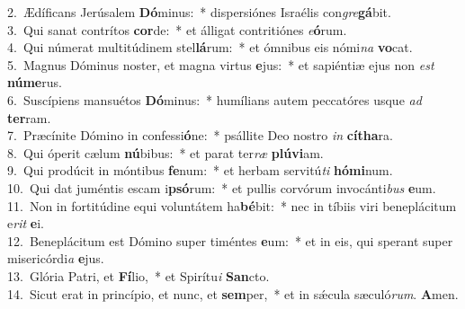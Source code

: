 {2.~}Ædíficans Jerúsalem \textbf{Dó}minus:~* dispersiónes Israélis con\textit{gre}\textbf{gá}bit.\\
{3.~}Qui sanat contrítos \textbf{cor}de:~* et álligat contritiónes \textit{e}\textbf{ó}rum.\\
{4.~}Qui númerat multitúdinem stel\textbf{lá}rum:~* et ómnibus eis nómi\textit{na} \textbf{vo}cat.\\
{5.~}Magnus Dóminus noster, et magna virtus \textbf{e}jus:~* et sapiéntiæ ejus non \textit{est} \textbf{nú}\textbf{me}rus.\\
{6.~}Suscípiens mansuétos \textbf{Dó}minus:~* humílians autem peccatóres usque \textit{ad} \textbf{ter}ram.\\
{7.~}Præcínite Dómino in confessi\textbf{ó}ne:~* psállite Deo nostro \textit{in} \textbf{cí}\textbf{tha}ra.\\
{8.~}Qui óperit cælum \textbf{nú}bibus:~* et parat ter\textit{ræ} \textbf{plú}\textbf{vi}am.\\
{9.~}Qui prodúcit in móntibus \textbf{fe}num:~* et herbam servitú\textit{ti} \textbf{hó}\textbf{mi}num.\\
{10.~}Qui dat juméntis escam i\textbf{psó}rum:~* et pullis corvórum invocánti\textit{bus} \textbf{e}um.\\
{11.~}Non in fortitúdine equi voluntátem ha\textbf{bé}bit:~* nec in tíbiis viri beneplácitum e\textit{rit} \textbf{e}i.\\
{12.~}Beneplácitum est Dómino super timéntes \textbf{e}um:~* et in eis, qui sperant super misericórdi\textit{a} \textbf{e}jus.\\
{13.~}Glória Patri, et \textbf{Fí}lio,~* et Spirítu\textit{i} \textbf{San}cto.\\
{14.~}Sicut erat in princípio, et nunc, et \textbf{sem}per,~* et in sǽcula sæculó\textit{rum}. \textbf{A}men.\\
